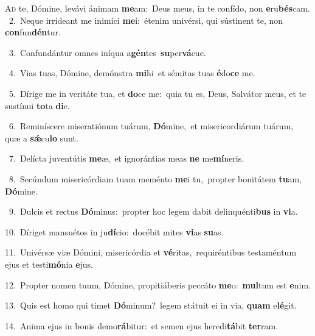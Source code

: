 \lettrine{\initial\textcolor{\initialcolor}{A}}{d} te, Dómine, levávi ánimam \textbf{me}\-am:~\star Deus meus, in te confído, non \textbf{e}\-ru\-\textbf{bés}\-cam.\\
{\numbfont\textcolor{\numbcolor}{~2.}}~Neque irrídeant me inimíci \textbf{me}\-i:~\star étenim univérsi, qui sústinent te, non \textbf{con}\-fun\-\textbf{dén}\-tur.\par
{\numbfont\textcolor{\numbcolor}{~3.}}~Confundántur omnes iníqua a\-\textbf{gén}\-tes~\star \textbf{su}\-per\-\textbf{vá}\-cue.\par
{\numbfont\textcolor{\numbcolor}{~4.}}~Vias tuas, Dómine, demónstra \textbf{mi}\-hi~\star et sémitas tuas \textbf{é}\-do\textbf{ce} me.\par
{\numbfont\textcolor{\numbcolor}{~5.}}~Dírige me in veritáte tua, et \textbf{do}\-ce me:~\star quia tu es, Deus, Salvátor meus, et te sustínui \textbf{to}\-ta \textbf{di}\-e.\par
{\numbfont\textcolor{\numbcolor}{~6.}}~Reminíscere miseratiónum tuárum, \textbf{Dó}\-mine,~\star et misericordiárum tuárum, quæ a \textbf{sǽ}\-cu\textbf{lo} sunt.\par
{\numbfont\textcolor{\numbcolor}{~7.}}~Delícta juventútis \textbf{me}\-æ,~\star et ignorántias meas \textbf{ne} me\-\textbf{mí}\-neris.\par
{\numbfont\textcolor{\numbcolor}{~8.}}~Secúndum misericórdiam tuam meménto \textbf{me}\-i tu,~\star propter bonitátem \textbf{tu}\-am, \textbf{Dó}\-mine.\par
{\numbfont\textcolor{\numbcolor}{~9.}}~Dulcis et rectus \textbf{Dó}\-minus:~\star propter hoc legem dabit delinquénti\textbf{bus} in \textbf{vi}\-a.\par
{\numbfont\textcolor{\numbcolor}{10.}}~Díriget mansuétos in ju\-\textbf{dí}\-cio:~\star docébit mites \textbf{vi}\-as \textbf{su}\-as.\par
{\numbfont\textcolor{\numbcolor}{11.}}~Univérsæ viæ Dómini, misericórdia et \textbf{vé}\-ritas,~\star requiréntibus testaméntum ejus et testi\-\textbf{mó}\-nia \textbf{e}\-jus.\par
{\numbfont\textcolor{\numbcolor}{12.}}~Propter nomen tuum, Dómine, propitiáberis peccáto \textbf{me}\-o:~\star \textbf{mul}\-tum est \textbf{e}\-nim.\par
{\numbfont\textcolor{\numbcolor}{13.}}~Quis est homo qui timet \textbf{Dó}\-minum?~\star legem státuit ei in via, \textbf{quam} e\-\textbf{lé}\-git.\par
{\numbfont\textcolor{\numbcolor}{14.}}~Anima ejus in bonis demo\-\textbf{rá}\-bitur:~\star et semen ejus heredi\-\textbf{tá}\-bit \textbf{ter}\-ram.\par
